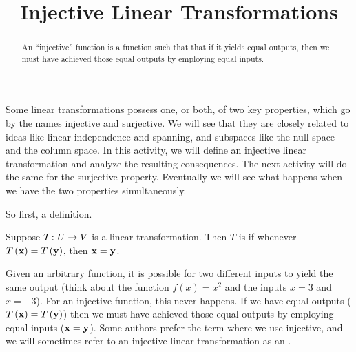 \documentclass{ximera}
\title{Injective Linear Transformations}
\begin{document}
\begin{abstract}
  An ``injective'' function is a function such that that if it yields
  equal outputs, then we must have achieved those equal outputs by
  employing equal inputs.
\end{abstract}
\maketitle

Some linear transformations possess one, or both, of two key properties, which go by the names injective and surjective.  We will see that they are closely related to ideas like linear independence and spanning, and subspaces like the null space and the column space.  In this activity, we will define an injective linear transformation and analyze the resulting consequences.  The next activity will do the same for the surjective property.  Eventually we will see what happens when we have the two properties simultaneously.

So first, a definition.

\begin{definition}
Suppose $T\colon U\rightarrow V$ is a linear transformation.  Then $T$ is  if whenever $T\left(\mathbf{x}\right)=T\left(\mathbf{y}\right)$, then $\mathbf{x}=\mathbf{y}$.
\end{definition}

Given an arbitrary function, it is possible for two different inputs to yield the same output (think about the function $f(x)=x^2$ and the inputs $x=3$ and $x=-3$).  For an injective function, this never happens.  If we have equal outputs ($T\left(\mathbf{x}\right)=T\left(\mathbf{y}\right)$) then we must have achieved those equal outputs by employing equal inputs ($\mathbf{x}=\mathbf{y}$).  Some authors prefer the term  where we use injective, and we will sometimes refer to an injective linear transformation as an .
\end{document}
